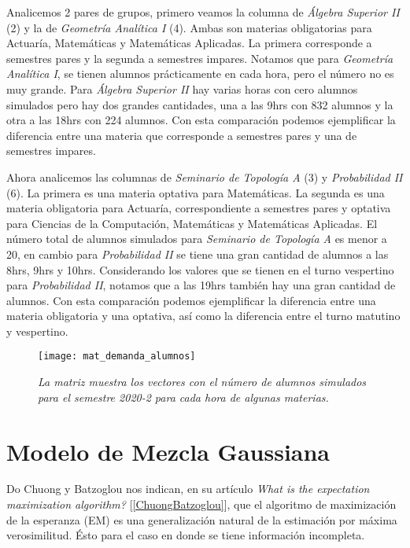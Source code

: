 Analicemos 2 pares de grupos, primero veamos la columna de \textit{Álgebra Superior II} (2) y la de \textit{Geometría Analítica I} (4). Ambas son materias obligatorias para Actuaría, Matemáticas y Matemáticas Aplicadas. La primera corresponde a semestres pares y la segunda a semestres impares. Notamos que para \textit{Geometría Analítica I}, se tienen alumnos prácticamente en cada hora, pero el número no es muy grande. Para \textit{Álgebra Superior II} hay varias horas con cero alumnos simulados pero hay dos grandes cantidades, una a las 9hrs con 832 alumnos y la otra a las 18hrs con 224 alumnos. Con esta comparación podemos ejemplificar la diferencia entre una materia que corresponde a semestres pares y una de semestres impares.

Ahora analicemos las columnas de \textit{Seminario de Topología A} (3) y \textit{Probabilidad II} (6). La primera es una materia optativa para Matemáticas. La segunda es una materia obligatoria para Actuaría, correspondiente a semestres pares y optativa para Ciencias de la Computación, Matemáticas y Matemáticas Aplicadas. El número total de alumnos simulados para \textit{Seminario de Topología A} es menor a 20, en cambio para \textit{Probabilidad II} se tiene una gran cantidad de alumnos a las 8hrs, 9hrs y 10hrs. Considerando los valores que se tienen en el turno vespertino para \textit{Probabilidad II}, notamos que a las 19hrs también hay una gran cantidad de alumnos. Con esta comparación podemos ejemplificar la diferencia entre una materia obligatoria y una optativa, así como la diferencia entre el turno matutino y vespertino.


\begin{figure}[H]
\centering
\texttt{[image: mat\_demanda\_alumnos]} %
\caption[\textit{Ejemplo de matriz con demanda simulada para el 2020-2}]{\textit{La matriz muestra los vectores con el número de alumnos simulados para el semestre 2020-2 para cada hora de algunas materias.}}\label{matDemandaAlum}
\end{figure}


\section{Modelo de Mezcla Gaussiana} \label{sec_GMM}

Do Chuong y Batzoglou nos indican, en su artículo \textit{What is the expectation maximization algorithm?} [\ref{ChuongBatzoglou}], que el algoritmo de maximización de la esperanza (EM) es una generalización natural de la estimación por máxima verosimilitud. Ésto para el caso en donde se tiene información incompleta.

